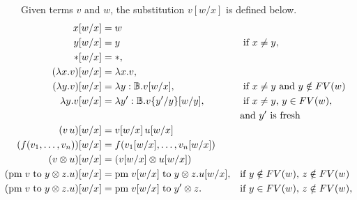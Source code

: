 \begin{definition}
Given terms $v$ and $w$, the substitution $ v[w/x]$ is defined below. 
\begin{align*}
   \hspace{-23pt}  x[w/x] &= w \\
   \hspace{-23pt}  y[w/x] &= y && \text{ if $x \neq y$}, \\
  \hspace{-23pt}   *[w/x] &=   * ,\\
  \hspace{-23pt}  (\lambda x. v)[w/x] &=  \lambda x. v,  \\
  \hspace{-23pt}  (\lambda y. v)[w/x] &=  \lambda y: \mathbb{B}. v[w/x],  &&\text{ if $x \neq y$ and $y \notin FV(w)$}  \\
   \hspace{-23pt}  \lambda y. v[w/x] &=  \lambda y': \mathbb{B}. v\{y'/y\}[w/y],  &&\text{ if $x \neq y$, $y \in FV(w),$}  \\
   \hspace{-23pt}& && \text{and $y'$ is fresh}\\
   \hspace{-23pt} (v \, u) [w/x] &= v [w/x] \, u [w/x] \\
   \hspace{-23pt}  (f(v_1, \ldots, v_n))[w/x] & = f(v_1[w/x], \ldots, v_n[w/x]) \\
   \hspace{-23pt}  (v \otimes u)[w/x] & = (v[w/x] \otimes u[w/x]) \\
   \hspace{-23pt} (\text{pm} \hspace{3 pt} v \hspace{3 pt} \text{to} \hspace{3 pt} y \otimes z. u)[w/x] &= \text{pm} \hspace{3 pt} v[w/x] \hspace{3 pt} \text{to} \hspace{3 pt} y \otimes z. u [w/x],  &&   \text{if $y \notin FV(w)$, $z \notin FV(w)$} \\
   \hspace{-23pt} (\text{pm} \hspace{3 pt} v \hspace{3 pt} \text{to} \hspace{3 pt} y \otimes z. u)[w/x] &= \text{pm} \hspace{3 pt} v [w/x] \hspace{3 pt} \text{to} \hspace{3 pt} y' \otimes z.  &&  \text{if $y \in FV(w)$, $z \notin FV(w)$,  } \\

\end{align*}
\end{definition}
